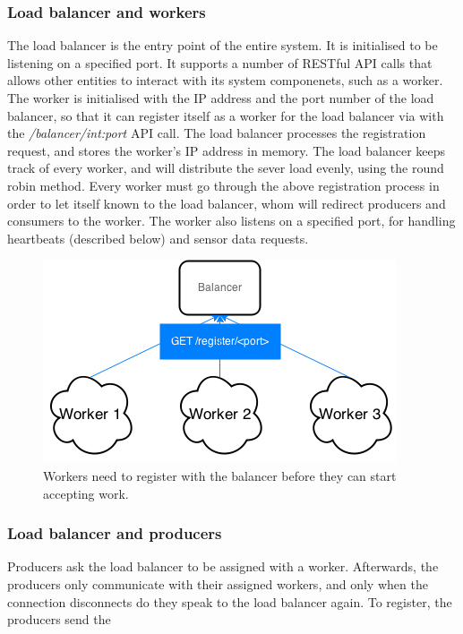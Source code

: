 \documentclass{sigchi}
\begin{document}
\subsubsection{Load balancer and workers}

The load balancer is the entry point of the entire system. It is initialised to be listening on a specified port. It supports a number of RESTful API calls that allows other entities to interact with its system componenets, such as a worker. The worker is initialised with the IP address and the port number of the load balancer, so that it can register itself as a worker for the load balancer via with the {\it /balancer/int:port} API call. The load balancer processes the registration request, and stores the worker's IP address in memory. The load balancer keeps track of every worker, and will distribute the sever load evenly, using the round robin method. Every worker must go through the above registration process in order to let itself known to the load balancer, whom will redirect producers and consumers to the worker. The worker also listens on a specified port, for handling heartbeats (described below) and sensor data requests.

\begin{figure}[!h]
\centering
\includegraphics[width=0.9\columnwidth]{img/workerreg}
\caption{Workers need to register with the balancer before they can start accepting work.}
\label{fig:worker}
\end{figure}

\subsubsection{Load balancer and producers}

Producers ask the load balancer to be assigned with a worker. Afterwards, the producers only communicate with their assigned workers, and only when the connection disconnects do they speak to the load balancer again. To register, the producers send the 
\end{document}
